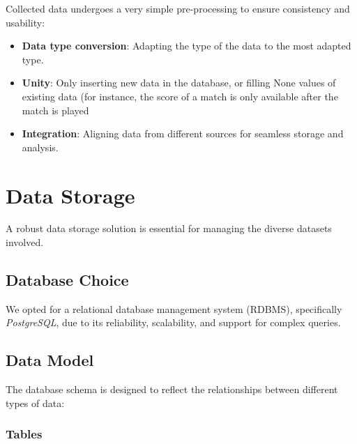 Collected data undergoes a very simple pre-processing to ensure consistency and usability:

\begin{itemize}
    \item \textbf{Data type conversion}: Adapting the type of the data to the most adapted type.
    \item \textbf{Unity}: Only inserting new data in the database, or filling None values of existing data (for instance, the score of a match is only available after the match is played 
    \item \textbf{Integration}: Aligning data from different sources for seamless storage and analysis.
\end{itemize}

\section{Data Storage}

A robust data storage solution is essential for managing the diverse datasets involved.

\subsection{Database Choice}

We opted for a relational database management system (RDBMS), specifically \textit{PostgreSQL}, due to its reliability, scalability, and support for complex queries.

\subsection{Data Model}

The database schema is designed to reflect the relationships between different types of data:

\subsubsection{Tables}

